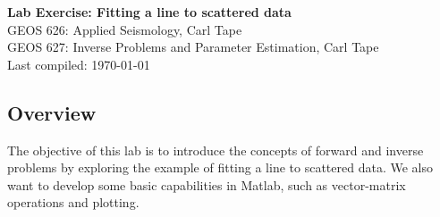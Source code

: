 \documentclass[11pt,titlepage,fleqn]{article}
\begin{document}

\begin{spacing}{1.2}
\centering
{\large \bf Lab Exercise: Fitting a line to scattered data} \\
GEOS 626: Applied Seismology, Carl Tape \\
GEOS 627: Inverse Problems and Parameter Estimation, Carl Tape \\
Last compiled: \today
\end{spacing}


\subsection*{Overview}

The objective of this lab is to introduce the concepts of forward and inverse problems by exploring the example of fitting a line to scattered data. We also want to develop some basic capabilities in Matlab, such as vector-matrix operations and plotting.
\end{document}
